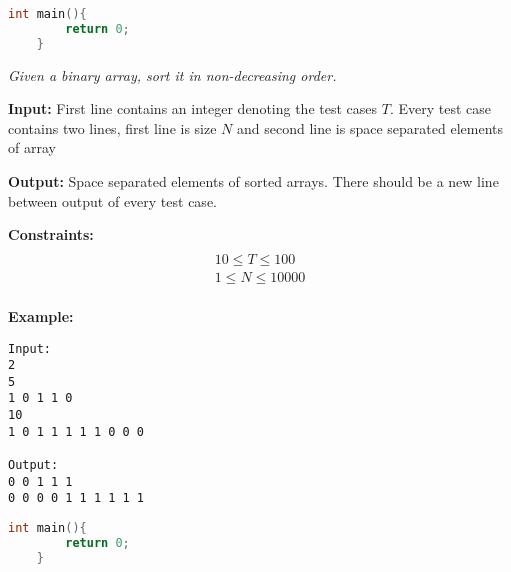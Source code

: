 \begin{solution}
\begin{lstlisting}[language=C++, caption="C++ Solution"]
	int main(){
		return 0;	
	}
\end{lstlisting}

\end{solution}



\begin{problem}
\textit{Given a binary array, sort it in non-decreasing order.}

\textbf{Input:}
First line contains an integer denoting the test cases $T$.  Every test case contains two lines, first line is size $N$ and second line is space separated elements of array

\textbf{Output:}
Space separated elements of sorted arrays.  There should be a new line between output of every test case.

\textbf{Constraints:}
\begin{multline}\\
10 \leq T \leq 100\\
1 \leq N \leq 10000\\
\end{multline}

\textbf{Example:}
\begin{verbatim}
Input:
2
5
1 0 1 1 0
10
1 0 1 1 1 1 1 0 0 0

Output:
0 0 1 1 1
0 0 0 0 1 1 1 1 1 1 

\end{verbatim}

\end{problem}

\begin{solution}
\begin{lstlisting}[language=C++, caption="C++ Solution"]
	int main(){
		return 0;	
	}
\end{lstlisting}

\end{solution}



